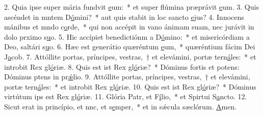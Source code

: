 2. Quia ipse super mária fundvit \uline{e}um:~* et super flúmina præprávit \uline{e}um.
3. Quis ascéndet in mntem D\uline{ó}mini?~* aut quis stabit in loc sancto \uline{e}jus?
4. Innocens mánibus et mndo c\uline{o}rde,~* qui non accépit in vano ánimam suam, nec jurávit in dolo prximo s\uline{u}o.
5. Hic accípiet benedictiónm a D\uline{ó}mino:~* et misericórdiam a Deo, saltári s\uline{u}o.
6. Hæc est generátio quæréntum \uline{e}um,~* quæréntium fácim Dei J\uline{a}cob.
7. Attóllite portas, príncipes, vestras,~† et elevámini, portæ tern\uline{á}les:~* et introbit Rex gl\uline{ó}riæ.
8. Quis est ist Rex gl\uline{ó}riæ?~* Dóminus fortis et potens: Dóminus ptens in pr\uline{ǽ}lio.
9. Attóllite portas, príncipes, vestras,~† et elevámini, portæ tern\uline{á}les:~* et introbit Rex gl\uline{ó}riæ.
10. Quis est ist Rex gl\uline{ó}riæ?~* Dóminus virtútum ips est Rex gl\uline{ó}riæ.
11. Glória Patr, et F\uline{í}lio,~* et Spirtui S\uline{a}ncto.
12. Sicut erat in princípio, et nnc, et s\uline{e}mper,~* et in sǽcula sæclórum. \uline{A}men.

